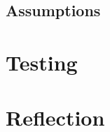\documentclass[11pt]{article}
\begin{document}
 \subsection{Assumptions}%



\section{Testing}%


\section{Reflection}





\end{document}
